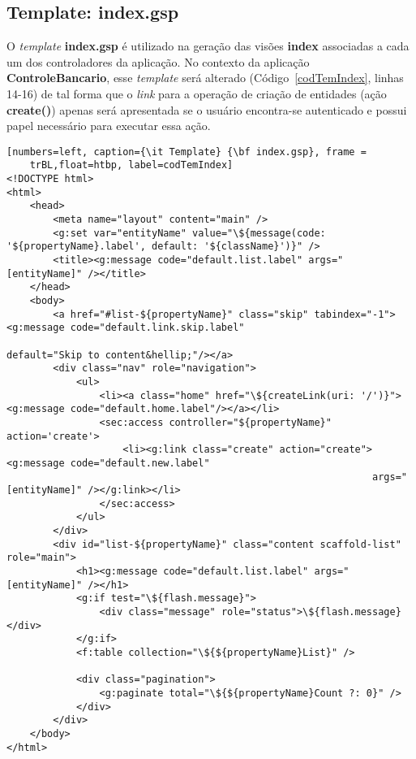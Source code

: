 \subsection{Template: index.gsp}

\vspace{0.5cm}

O {\it template}  {\bf index.gsp} é utilizado na geração  das visões {\bf index}
associadas a cada  um dos controladores da aplicação.   No contexto da aplicação
{\bf     ControleBancario},     esse     {\it    template}     será     alterado
(Código~\ref{codTemIndex}, linhas  14-16) de tal forma  que o {\it  link} para a
operação de criação  de entidades (ação {\bf create()})  apenas será apresentada
se o  usuário encontra-se  autenticado e possui  papel necessário  para executar
essa ação. 

\begin{lstlisting}[numbers=left, caption={\it Template} {\bf index.gsp}, frame =
    trBL,float=htbp, label=codTemIndex] 
<!DOCTYPE html>
<html>
    <head>
        <meta name="layout" content="main" />
        <g:set var="entityName" value="\${message(code: '${propertyName}.label', default: '${className}')}" />
        <title><g:message code="default.list.label" args="[entityName]" /></title>
    </head>
    <body>
        <a href="#list-${propertyName}" class="skip" tabindex="-1"><g:message code="default.link.skip.label" 
                                                                   default="Skip to content&hellip;"/></a>
        <div class="nav" role="navigation">
            <ul>
                <li><a class="home" href="\${createLink(uri: '/')}"><g:message code="default.home.label"/></a></li>
                <sec:access controller="${propertyName}" action='create'>
                    <li><g:link class="create" action="create"><g:message code="default.new.label" 
                                                               args="[entityName]" /></g:link></li>
                </sec:access>
            </ul>
        </div>
        <div id="list-${propertyName}" class="content scaffold-list" role="main">
            <h1><g:message code="default.list.label" args="[entityName]" /></h1>
            <g:if test="\${flash.message}">
                <div class="message" role="status">\${flash.message}</div>
            </g:if>
            <f:table collection="\${${propertyName}List}" />

            <div class="pagination">
                <g:paginate total="\${${propertyName}Count ?: 0}" />
            </div>
        </div>
    </body>
</html>
\end{lstlisting}

